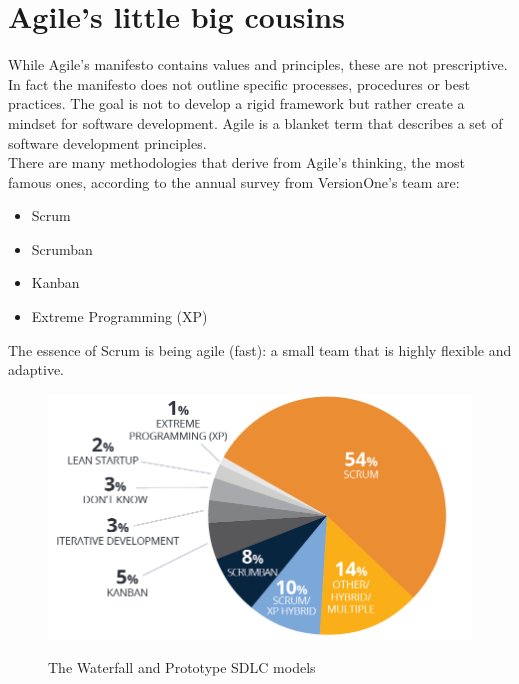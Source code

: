 \section{Agile's little big cousins}
	While Agile's manifesto contains values and principles, these are not prescriptive.
	In fact the manifesto does not outline specific processes, procedures or best practices.
	The goal is not to develop a rigid framework but rather create a mindset for software development.
	Agile is a blanket term that describes a set of software development principles.\\
	There are many methodologies that derive from Agile's thinking, the most famous ones, according to the annual survey from VersionOne's team are:
	\begin{itemize}
		\item Scrum
		\item Scrumban
		\item Kanban
		\item Extreme Programming (XP)
	\end{itemize}
	The essence of Scrum is being agile (fast): a small team that is highly flexible and adaptive.
	\begin{figure}[H]
		\centering
		\includegraphics[width=.8\textwidth]{resources/agile-usage-chart}\\
		\caption{The Waterfall and Prototype SDLC models}
	\end{figure}

